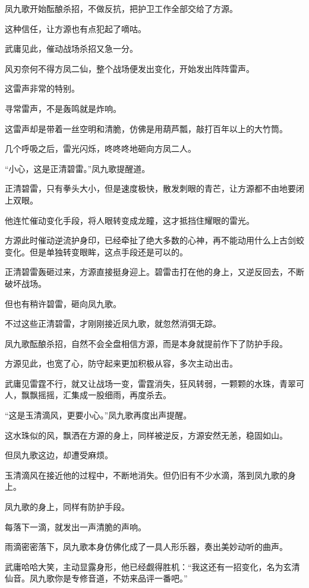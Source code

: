 \begin{this_body}
凤九歌开始酝酿杀招，不做反抗，把护卫工作全部交给了方源。

这种信任，让方源也有点犯起了嘀咕。

武庸见此，催动战场杀招又急一分。

风刃奈何不得方凤二仙，整个战场便发出变化，开始发出阵阵雷声。

这雷声非常的特别。

寻常雷声，不是轰鸣就是炸响。

这雷声却是带着一丝空明和清脆，仿佛是用葫芦瓢，敲打百年以上的大竹筒。

几个呼吸之后，雷光闪烁，咚咚咚地砸向方凤二人。

“小心，这是正清碧雷。”凤九歌提醒道。

正清碧雷，只有拳头大小，但是速度极快，散发刺眼的青芒，让方源都不由地要闭上双眼。

他连忙催动变化手段，将人眼转变成龙瞳，这才抵挡住耀眼的雷光。

方源此时催动逆流护身印，已经牵扯了绝大多数的心神，再不能动用什么上古剑蛟变化。但是单独转变眼眸，这点手段还是可以的。

正清碧雷轰砸过来，方源直接挺身迎上。碧雷击打在他的身上，又逆反回去，不断破坏战场。

但也有稍许碧雷，砸向凤九歌。

不过这些正清碧雷，才刚刚接近凤九歌，就忽然消弭无踪。

凤九歌酝酿杀招，自然不会全盘相信方源，而是本身就提前作下了防护手段。

方源见此，也宽了心，防守起来更加积极从容，多次主动出击。

武庸见雷霆不行，就又让战场一变，雷霆消失，狂风转弱，一颗颗的水珠，青翠可人，飘飘摇摇，汇集成一股细雨，再度杀去。

“这是玉清滴风，更要小心。”凤九歌再度出声提醒。

这水珠似的风，飘洒在方源的身上，同样被逆反，方源安然无恙，稳固如山。

但凤九歌这边，却遭受麻烦。

玉清滴风在接近他的过程中，不断地消失。但仍旧有不少水滴，落到凤九歌的身上。

凤九歌的身上，同样有防护手段。

每落下一滴，就发出一声清脆的声响。

雨滴密密落下，凤九歌本身仿佛化成了一具人形乐器，奏出美妙动听的曲声。

武庸哈哈大笑，主动显露身形，他已经觑得胜机：“我这还有一招变化，名为玄清仙音。凤九歌你是专修音道，不妨来品评一番吧。”


\end{this_body}
